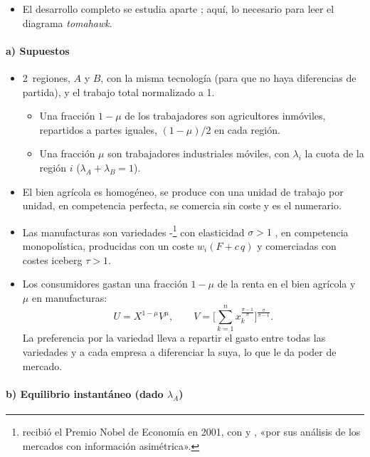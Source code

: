 \documentclass[11pt]{article}
\begin{document}
\begin{itemize}
\item El desarrollo completo se estudia aparte ; aquí, lo necesario para leer el diagrama \emph{tomahawk}\nocite{Krugman1991Increasing,FujitaKrugmanVenables1999Spatial}.
\end{itemize}

\paragraph{a) Supuestos}

\begin{itemize}
\item 2~regiones, $A$ y $B$, con la misma tecnología (para que no haya diferencias de partida), y el trabajo total normalizado a 1.
  \begin{itemize}
  \item Una fracción $1-\mu$ de los trabajadores son agricultores inmóviles, repartidos a partes iguales, $(1-\mu)/2$ en cada región.
  \item Una fracción $\mu$ son trabajadores industriales móviles, con $\lambda_i$ la cuota de la región $i$ ($\lambda_A+\lambda_B=1$).
  \end{itemize}
\item El bien agrícola es homogéneo, se produce con una unidad de trabajo por unidad, en competencia perfecta, se comercia sin coste y es el numerario.
\item Las manufacturas son variedades -\footnote{ recibió el Premio Nobel de Economía en 2001, con  y , «por sus análisis de los mercados con información asimétrica»\nocite{Nobel2001AkerlofSpenceStiglitz}.} con elasticidad $\sigma>1$ , en competencia monopolística, producidas con un coste $w_i(F+c\,q)$ y comerciadas con costes iceberg $\tau>1$.
\item Los consumidores gastan una fracción $1-\mu$ de la renta en el bien agrícola y $\mu$ en manufacturas:
  \[
  U=X^{1-\mu}V^{\mu},\qquad V=\Big[\sum_{k=1}^{n}x_k^{\frac{\sigma-1}{\sigma}}\Big]^{\frac{\sigma}{\sigma-1}}.
  \]
  La preferencia por la variedad lleva a repartir el gasto entre todas las variedades y a cada empresa a diferenciar la suya, lo que le da poder de mercado.
\end{itemize}

\paragraph{b) Equilibrio instantáneo (dado $\lambda_A$)}
\end{document}
